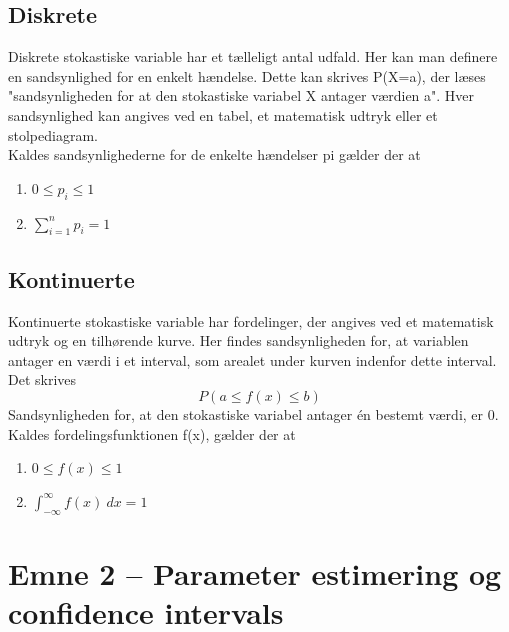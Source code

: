 \documentclass[11pt]{article}
\begin{document}
\subsection{Diskrete}
Diskrete stokastiske variable har et tælleligt antal udfald. Her kan man definere en sandsynlighed for en enkelt hændelse. Dette kan skrives P(X=a), der læses "sandsynligheden for at den stokastiske variabel X antager værdien a". Hver sandsynlighed kan angives ved en tabel, et matematisk udtryk eller et stolpediagram.\\[0.2cm]
Kaldes sandsynlighederne for de enkelte hændelser pi gælder der at
\begin{enumerate}
\item $0\leq p_i \leq 1$
\item $\sum_{i=1}^n p_i=1$
\end{enumerate}
\subsection{Kontinuerte}
Kontinuerte stokastiske variable har fordelinger, der angives ved et matematisk udtryk og en tilhørende kurve. Her findes sandsynligheden for, at variablen antager en værdi i et interval, som arealet under kurven indenfor dette interval. Det skrives
$$P(a\leq f(x)\leq b)$$
Sandsynligheden for, at den stokastiske variabel antager én bestemt værdi, er 0.\\[0.2cm]
Kaldes fordelingsfunktionen f(x), gælder der at
\begin{enumerate}
\item $0 \leq f(x) \leq 1$
\item $\int_{-\infty}^{\infty}f(x)\:dx=1$
\end{enumerate}



\newpage
\section{Emne 2 -- Parameter estimering og confidence intervals}
\end{document}

